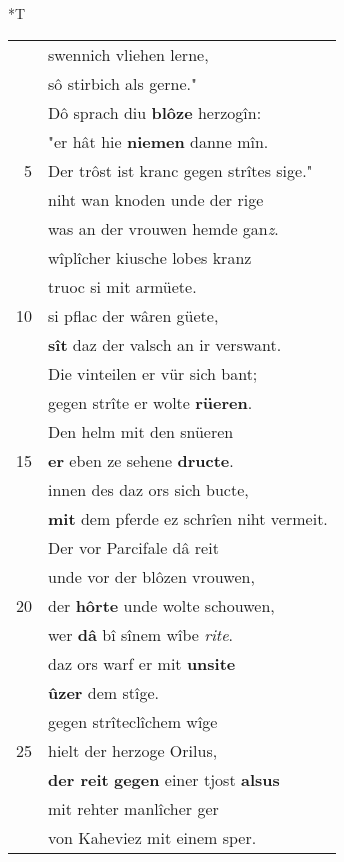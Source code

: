 \documentclass[8pt,a4paper,notitlepage]{article}
\begin{document}
\begin{table}[ht]
\begin{minipage}[t]{0.5\linewidth}
\end{minipage}
\hspace{0.5cm}
\begin{minipage}[t]{0.5\linewidth}
\small
\begin{center}*T
\end{center}
\begin{tabular}{rl}
 & swennich vliehen lerne,\\ 
 & sô stirbich als gerne."\\ 
 & Dô sprach diu \textbf{blôze} herzogîn:\\ 
 & "er hât hie \textbf{niemen} danne mîn.\\ 
5 & Der trôst ist kranc gegen strîtes sige."\\ 
 & niht wan knoden unde der rige\\ 
 & was an der vrouwen hemde gan\textit{z}.\\ 
 & wîplîcher kiusche lobes kranz\\ 
 & truoc si mit armüete.\\ 
10 & si pflac der wâren güete,\\ 
 & \textbf{sît} daz der valsch an ir verswant.\\ 
 & Die vinteilen er vür sich bant;\\ 
 & gegen strîte er wolte \textbf{rüeren}.\\ 
 & Den helm mit den snüeren\\ 
15 & \textbf{er} eben ze sehene \textbf{dructe}.\\ 
 & innen des daz ors sich bucte,\\ 
 & \textbf{mit} dem pferde ez schrîen niht vermeit.\\ 
 & Der vor Parcifale dâ reit\\ 
 & unde vor der blôzen vrouwen,\\ 
20 & der \textbf{hôrte} unde wolte schouwen,\\ 
 & wer \textbf{dâ} bî sînem wîbe \textit{rite}.\\ 
 & daz ors warf er mit \textbf{unsite}\\ 
 & \textbf{ûzer} dem stîge.\\ 
 & gegen strîteclîchem wîge\\ 
25 & hielt der herzoge Orilus,\\ 
 & \textbf{der reit} \textbf{gegen} einer tjost \textbf{alsus}\\ 
 & mit rehter manlîcher ger\\ 
 & von Kaheviez mit einem sper.\\ 

\end{tabular}
\end{minipage}
\end{table}
\end{document}

